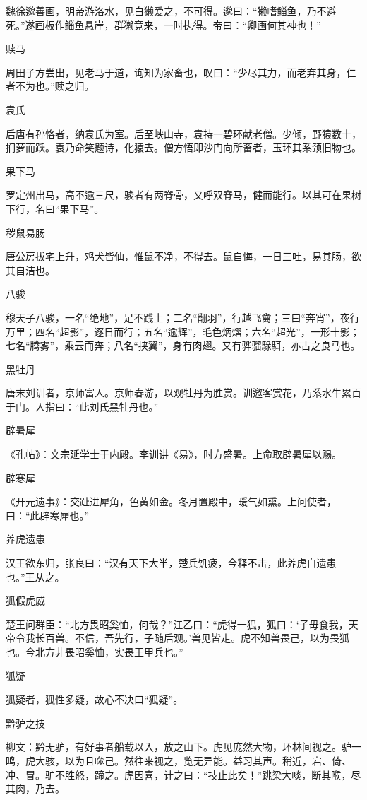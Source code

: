 \documentclass[a4paper,12pt,UTF8,twoside]{ctexbook}
\begin{document}
    魏徐邈善画，明帝游洛水，见白獭爱之，不可得。邈曰：“獭嗜鲻鱼，乃不避死。”遂画板作鲻鱼悬岸，群獭竞来，一时执得。帝曰：“卿画何其神也！”
    
    赎马
    
    周田子方尝出，见老马于道，询知为家畜也，叹曰：“少尽其力，而老弃其身，仁者不为也。”赎之归。
    
    袁氏
    
    后唐有孙恪者，纳袁氏为室。后至峡山寺，袁持一碧环献老僧。少倾，野猿数十，扪萝而跃。袁乃命笑题诗，化猿去。僧方悟即沙门向所畜者，玉环其系颈旧物也。
    
    果下马
    
    罗定州出马，高不逾三尺，骏者有两脊骨，又呼双脊马，健而能行。以其可在果树下行，名曰“果下马”。
    
    秽鼠易肠
    
    唐公房拔宅上升，鸡犬皆仙，惟鼠不净，不得去。鼠自悔，一日三吐，易其肠，欲其自洁也。
    
    八骏
    
    穆天子八骏，一名“绝地”，足不践土；二名“翻羽”，行越飞禽；三曰“奔宵”，夜行万里；四名“超影”，逐日而行；五名“逾辉”，毛色炳熠；六名“超光”，一形十影；七名“腾雾”，乘云而奔；八名“挟翼”，身有肉翅。又有骅骝騄駬，亦古之良马也。
    
    黑牡丹
    
    唐末刘训者，京师富人。京师春游，以观牡丹为胜赏。训邀客赏花，乃系水牛累百于门。人指曰：“此刘氏黑牡丹也。”
    
    辟暑犀
    
    《孔帖》：文宗延学士于内殿。李训讲《易》，时方盛暑。上命取辟暑犀以赐。
    
    辟寒犀
    
    《开元遗事》：交趾进犀角，色黄如金。冬月置殿中，暖气如熏。上问使者，曰：“此辟寒犀也。”
    
    养虎遗患
    
    汉王欲东归，张良曰：“汉有天下大半，楚兵饥疲，今释不击，此养虎自遗患也。”王从之。
    
    狐假虎威
    
    楚王问群臣：“北方畏昭奚恤，何哉？”江乙曰：“虎得一狐，狐曰：‘子毋食我，天帝令我长百兽。不信，吾先行，子随后观。’兽见皆走。虎不知兽畏己，以为畏狐也。今北方非畏昭奚恤，实畏王甲兵也。”
    
    狐疑
    
    狐疑者，狐性多疑，故心不决曰“狐疑”。
    
    黔驴之技
    
    柳文：黔无驴，有好事者船载以入，放之山下。虎见庞然大物，环林间视之。驴一鸣，虎大骇，以为且噬己。然往来视之，览无异能。益习其声。稍近，宕、倚、冲、冒。驴不胜怒，蹄之。虎因喜，计之曰：“技止此矣！”跳梁大啖，断其喉，尽其肉，乃去。
    
\end{document}
